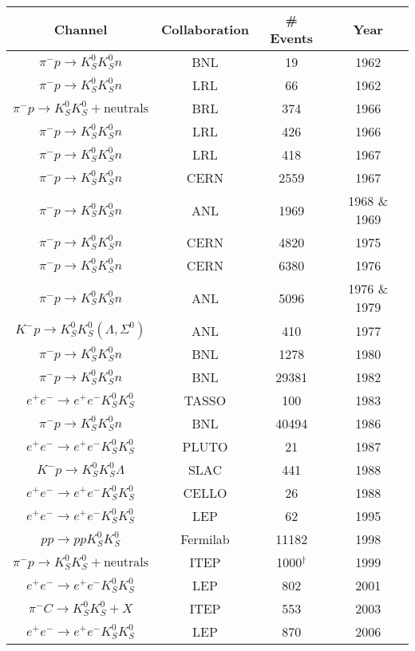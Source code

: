 \begin{table}
  \begin{center}
    \begin{tabular}{cccc}\toprule
      Channel & Collaboration & \# Events & Year\\\midrule
      $\pi^- p \to K_S^0 K_S^0 n$ & BNL & 19 & 1962\\
      $\pi^- p \to K_S^0 K_S^0 n$ & LRL & 66 & 1962\\
      $\pi^- p \to K_S^0 K_S^0 + \text{neutrals}$ & BRL & 374 & 1966\\
      $\pi^- p \to K_S^0 K_S^0 n$ & LRL & 426 & 1966\\
      $\pi^- p \to K_S^0 K_S^0 n$ & LRL & 418 & 1967\\
      $\pi^- p \to K_S^0 K_S^0 n$ & CERN & 2559 & 1967\\
      $\pi^- p \to K_S^0 K_S^0 n$ & ANL & 1969 & 1968 \& 1969\\
      $\pi^- p \to K_S^0 K_S^0 n$ & CERN & 4820 & 1975\\
      $\pi^- p \to K_S^0 K_S^0 n$ & CERN & 6380 & 1976\\
      $\pi^- p \to K_S^0 K_S^0 n$ & ANL & 5096 & 1976 \& 1979\\
      $K^- p \to K_S^0 K_S^0 (\Lambda, \Sigma^0)$ & ANL & 410 & 1977\\
      $\pi^- p \to K_S^0 K_S^0 n$ & BNL & 1278 & 1980\\
      $\pi^- p \to K_S^0 K_S^0 n$ & BNL & 29381 & 1982\\
      $e^+e^- \to e^+e^- K_S^0 K_S^0$ & TASSO & 100 & 1983\\
      $\pi^- p \to K_S^0 K_S^0 n$ & BNL & 40494 & 1986\\
      $e^+e^- \to e^+e^- K_S^0 K_S^0$ & PLUTO & 21 & 1987\\
      $K^- p \to K_S^0 K_S^0 \Lambda$ & SLAC & 441 & 1988\\
      $e^+e^- \to e^+e^- K_S^0 K_S^0$ & CELLO & 26 & 1988\\
      $e^+e^- \to e^+e^- K_S^0 K_S^0$ & LEP & 62 & 1995\\
      $pp \to pp K_S^0 K_S^0$ & Fermilab & 11182 & 1998\\
      $\pi^- p \to K_S^0 K_S^0 + \text{neutrals}$ & ITEP & 1000${}^\dagger$ & 1999\\
      $e^+e^- \to e^+e^- K_S^0 K_S^0$ & LEP & 802 & 2001\\
      $\pi^- C \to K_S^0 K_S^0 + X$ & ITEP & 553 & 2003\\
      $e^+e^- \to e^+e^- K_S^0 K_S^0$ & LEP & 870 & 2006\\

\end{tabular}
\end{center}
\end{table}
